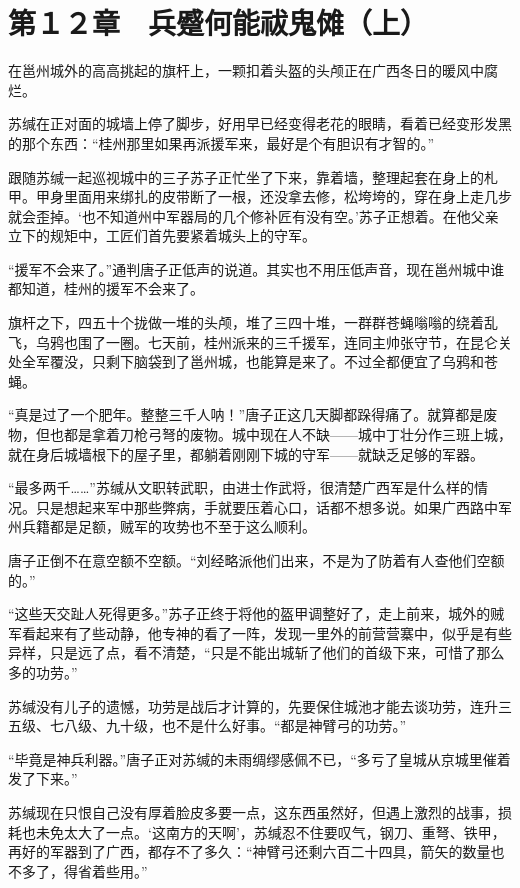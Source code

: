 \section{第１２章　兵蹙何能祓鬼傩（上）}

在邕州城外的高高挑起的旗杆上，一颗扣着头盔的头颅正在广西冬日的暖风中腐烂。

苏缄在正对面的城墙上停了脚步，好用早已经变得老花的眼睛，看着已经变形发黑的那个东西：“桂州那里如果再派援军来，最好是个有胆识有才智的。”

跟随苏缄一起巡视城中的三子苏子正忙坐了下来，靠着墙，整理起套在身上的札甲。甲身里面用来绑扎的皮带断了一根，还没拿去修，松垮垮的，穿在身上走几步就会歪掉。‘也不知道州中军器局的几个修补匠有没有空。’苏子正想着。在他父亲立下的规矩中，工匠们首先要紧着城头上的守军。

“援军不会来了。”通判唐子正低声的说道。其实也不用压低声音，现在邕州城中谁都知道，桂州的援军不会来了。

旗杆之下，四五十个拢做一堆的头颅，堆了三四十堆，一群群苍蝇嗡嗡的绕着乱飞，乌鸦也围了一圈。七天前，桂州派来的三千援军，连同主帅张守节，在昆仑关处全军覆没，只剩下脑袋到了邕州城，也能算是来了。不过全都便宜了乌鸦和苍蝇。

“真是过了一个肥年。整整三千人呐！”唐子正这几天脚都跺得痛了。就算都是废物，但也都是拿着刀枪弓弩的废物。城中现在人不缺——城中丁壮分作三班上城，就在身后城墙根下的屋子里，都躺着刚刚下城的守军——就缺乏足够的军器。

“最多两千……”苏缄从文职转武职，由进士作武将，很清楚广西军是什么样的情况。只是想起来军中那些弊病，手就要压着心口，话都不想多说。如果广西路中军州兵籍都是足额，贼军的攻势也不至于这么顺利。

唐子正倒不在意空额不空额。“刘经略派他们出来，不是为了防着有人查他们空额的。”

“这些天交趾人死得更多。”苏子正终于将他的盔甲调整好了，走上前来，城外的贼军看起来有了些动静，他专神的看了一阵，发现一里外的前营营寨中，似乎是有些异样，只是远了点，看不清楚，“只是不能出城斩了他们的首级下来，可惜了那么多的功劳。”

苏缄没有儿子的遗憾，功劳是战后才计算的，先要保住城池才能去谈功劳，连升三五级、七八级、九十级，也不是什么好事。“都是神臂弓的功劳。”

“毕竟是神兵利器。”唐子正对苏缄的未雨绸缪感佩不已，“多亏了皇城从京城里催着发了下来。”

苏缄现在只恨自己没有厚着脸皮多要一点，这东西虽然好，但遇上激烈的战事，损耗也未免太大了一点。‘这南方的天啊’，苏缄忍不住要叹气，钢刀、重弩、铁甲，再好的军器到了广西，都存不了多久：“神臂弓还剩六百二十四具，箭矢的数量也不多了，得省着些用。”

